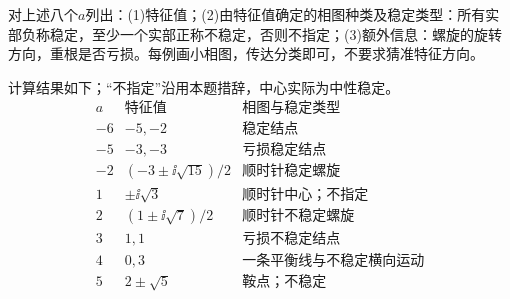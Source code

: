 \begin{exercise}\label{cw:rec23-3}
对上述八个$a$列出：(1)特征值；(2)由特征值确定的相图种类及稳定类型：所有实部负称稳定，至少一个实部正称不稳定，否则不指定；(3)额外信息：螺旋的旋转方向，重根是否亏损。每例画小相图，传达分类即可，不要求猜准特征方向。
\end{exercise}
\begin{solution}
计算结果如下；“不指定”沿用本题措辞，中心实际为中性稳定。
\[\begin{array}{c|c|l}
a&\text{特征值}&\text{相图与稳定类型}\\\hline
-6&-5,-2&\text{稳定结点}\\
-5&-3,-3&\text{亏损稳定结点}\\
-2&(-3\pm\ii\sqrt{15})/2&\text{顺时针稳定螺旋}\\
1&\pm\ii\sqrt3&\text{顺时针中心；不指定}\\
2&(1\pm\ii\sqrt7)/2&\text{顺时针不稳定螺旋}\\
3&1,1&\text{亏损不稳定结点}\\
4&0,3&\text{一条平衡线与不稳定横向运动}\\
5&2\pm\sqrt5&\text{鞍点；不稳定}
\end{array}\]

\end{solution}
